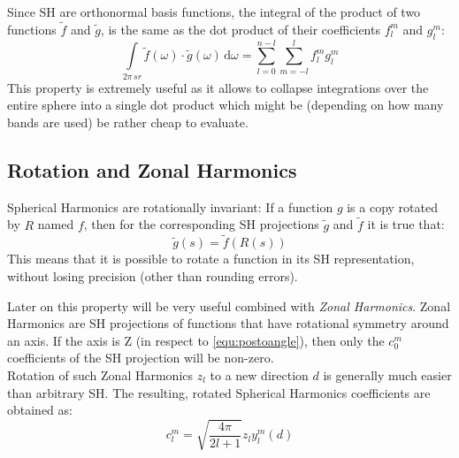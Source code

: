 \documentclass[thesis.tex]{subfiles}
\begin{document}
Since SH are orthonormal basis functions, the integral of the product of two functions $\widetilde{f}$ and $\widetilde{g}$, is the same as the dot product of their coefficients $f_l^m$ and $g_l^m$:
\begin{equation}
	\int\limits_{2\pi\,sr} \widetilde{f}(\omega) \cdot \widetilde{g}(\omega) \, \mathrm{d}\omega =
	\sum_{l=0}^{n-l}\sum_{m=-l}^l f_l^m g_l^m
\end{equation}
This property is extremely useful as it allows to collapse integrations over the entire sphere into a single dot product which might be (depending on how many bands are used) be rather cheap to evaluate.

\subsection{Rotation and Zonal Harmonics} \label{sec:preq:zonalharmonics}
Spherical Harmonics are rotationally invariant:
If a function $g$ is a copy rotated by $R$ named $f$, then for the corresponding SH projections $\widetilde{g}$ and $\widetilde{f}$ it is true that:
\begin{equation}
	\widetilde{g}(s) = \widetilde{f}(R(s))
\end{equation}
This means that it is possible to rotate a function in its SH representation, without losing precision (other than rounding errors).

Later on this property will be very useful combined with \emph{Zonal Harmonics}.
Zonal Harmonics are SH projections of functions that have rotational symmetry around an axis.
If the axis is Z (in respect to \autoref{equ:postoangle}), then only the $c^m_0$ coefficients of the SH projection will be non-zero.\\
Rotation of such Zonal Harmonics $z_l$ to a new direction $d$ is generally much easier than arbitrary SH.
The resulting, rotated Spherical Harmonics coefficients are obtained as:
\begin{equation} \label{eq:zonalrotate}
	c_l^m = \sqrt{\frac{4\pi}{2l+1}} z_l y_l^m(d)
\end{equation}

\subfilebib %
\end{document}
